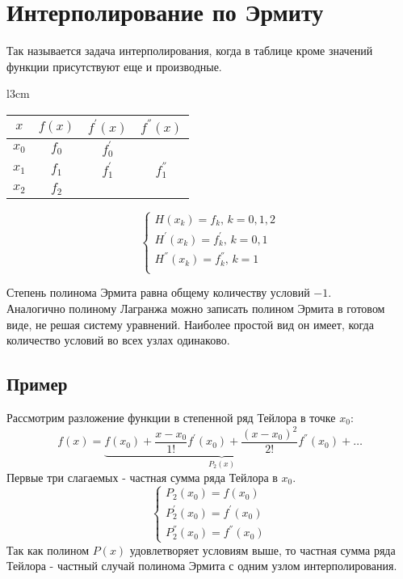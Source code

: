 \documentclass[a4paper,11pt]{article}
\begin{document}
\section{Интерполирование по Эрмиту}
Так называется задача интерполирования, когда в таблице кроме значений функции присутствуют еще и производные. \\
\begin{minipage}{1\linewidth}
  \begin{wraptable}{l}{3cm}
    \begin{tabular}{ c|c|c|c }
      $x$   & $f(x)$ & $f^{'}(x)$ & $f^{''}(x)$ \\
      \hline
      $x_0$ & $f_0$  & $f^{'}_0$  & \\
      $x_1$ & $f_1$  & $f^{'}_1$  & $f^{''}_1$ \\
      $x_2$ & $f_2$  &            &
    \end{tabular}
  \end{wraptable}
  \vspace{5mm}
  \begin{equation*}
    \begin{cases}
      H(x_k) = f_k,\, k = 0, 1, 2 \\
      H^{'}(x_k) = f^{'}_k,\, k = 0, 1 \\
      H^{''}(x_k) = f^{''}_k,\, k = 1 \\
    \end{cases}
  \end{equation*}
\end{minipage}

Степень полинома Эрмита равна общему количеству условий $-1$. \\
Аналогично полиному Лагранжа можно записать полином Эрмита в готовом виде, не решая систему уравнений. Наиболее простой вид он имеет, когда количество условий во всех узлах одинаково.
  \subsection{Пример}
  Рассмотрим разложение функции в степенной ряд Тейлора в точке $x_0$:
  \[f(x) = \underbrace{f(x_0) + \frac{x - x_0}{1!}f^{'}(x_0) + \frac{(x - x_0)^2}{2!}f^{''}(x_0)}_{P_2(x)} + \dots\]
  Первые три слагаемых - частная сумма ряда Тейлора в $x_0$.
  \begin{equation*}
    \begin{cases}
      P_2(x_0) = f(x_0) \\
      P^{'}_2(x_0) = f^{'}(x_0) \\
      P^{''}_2(x_0) = f^{''}(x_0)
    \end{cases}
  \end{equation*}
  Так как полином $P(x)$ удовлетворяет условиям выше, то частная сумма ряда Тейлора - частный случай полинома Эрмита с одним узлом интерполирования.
\end{document}
